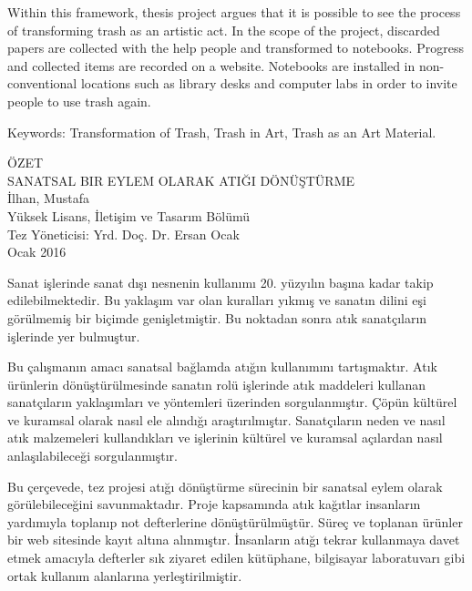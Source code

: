 \documentclass[12pt]{report}
\begin{document}
Within this framework, thesis project argues that it is possible to see the process of transforming trash as an artistic act. In the scope of the project, discarded papers are collected with the help people and transformed to notebooks. Progress and collected items are recorded on a website. Notebooks are installed in non-conventional locations such as library desks and computer labs in order to invite people to use trash again. 

\noindent Keywords: Transformation of Trash, Trash in Art, Trash as an Art Material.
\clearpage


\thispagestyle{plain}
{}
\doublespacing
\begin{center}
	\vspace*{25mm}
	\MakeUppercase{Özet}\\
    \vspace{\baselineskip}
    \MakeUppercase{Sanatsal Bir Eylem Olarak Atığı Dönüştürme}\\
    İlhan, Mustafa\\
    Yüksek Lisans, İletişim ve Tasarım Bölümü\\
    Tez Yöneticisi: Yrd. Doç. Dr. Ersan Ocak\\
    \vspace{\baselineskip}
    Ocak 2016
\end{center}
\singlespacing
\par Sanat işlerinde sanat dışı nesnenin kullanımı 20. yüzyılın başına kadar takip edilebilmektedir. Bu yaklaşım var olan kuralları yıkmış ve sanatın dilini eşi görülmemiş bir biçimde genişletmiştir. Bu noktadan sonra atık sanatçıların işlerinde yer bulmuştur.

Bu çalışmanın amacı sanatsal bağlamda atığın kullanımını tartışmaktır. Atık ürünlerin dönüştürülmesinde sanatın rolü işlerinde atık maddeleri kullanan sanatçıların yaklaşımları ve yöntemleri üzerinden sorgulanmıştır. Çöpün kültürel ve kuramsal olarak nasıl ele alındığı araştırılmıştır. Sanatçıların neden ve nasıl atık malzemeleri kullandıkları ve işlerinin kültürel ve kuramsal açılardan nasıl anlaşılabileceği sorgulanmıştır.

Bu çerçevede, tez projesi atığı dönüştürme sürecinin bir sanatsal eylem olarak görülebileceğini savunmaktadır. Proje kapsamında atık kağıtlar insanların yardımıyla toplanıp not defterlerine dönüştürülmüştür. Süreç ve toplanan ürünler bir web sitesinde kayıt altına alınmıştır. İnsanların atığı tekrar kullanmaya davet etmek amacıyla defterler sık ziyaret edilen kütüphane, bilgisayar laboratuvarı gibi ortak kullanım alanlarına yerleştirilmiştir.
\end{document}
